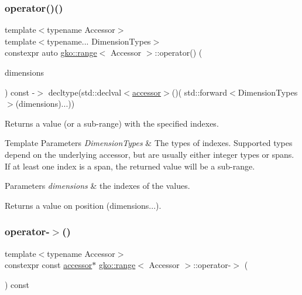 \subsubsection{\texorpdfstring{operator()()}{operator()()}}
{\footnotesize\ttfamily template$<$typename Accessor$>$ \\
template$<$typename... Dimension\+Types$>$ \\
constexpr auto \hyperlink{classgko_1_1range}{gko\+::range}$<$ Accessor $>$\+::operator() (\begin{DoxyParamCaption}\item[{Dimension\+Types \&\&...}]{dimensions }\end{DoxyParamCaption}) const -\/$>$ decltype(std\+::declval$<$\hyperlink{classgko_1_1range_a3332728e51dadcf6517847cef3000a17}{accessor}$>$()(
            std\+::forward$<$Dimension\+Types$>$(dimensions)...))
    }



Returns a value (or a sub-\/range) with the specified indexes. 


\begin{DoxyTemplParams}{Template Parameters}
{\em Dimension\+Types} & The types of indexes. Supported types depend on the underlying accessor, but are usually either integer types or spans. If at least one index is a span, the returned value will be a sub-\/range.\\
\hline
\end{DoxyTemplParams}

\begin{DoxyParams}{Parameters}
{\em dimensions} & the indexes of the values.\\
\hline
\end{DoxyParams}
\begin{DoxyReturn}{Returns}
a value on position {\ttfamily (dimensions...)}. 
\end{DoxyReturn}
\mbox{\label{classgko_1_1range_ad846fcf80cb6cd8881cd7dd8dddc6ca9}} 
\subsubsection{\texorpdfstring{operator-\/$>$()}{operator->()}}
{\footnotesize\ttfamily template$<$typename Accessor$>$ \\
constexpr const \hyperlink{classgko_1_1range_a3332728e51dadcf6517847cef3000a17}{accessor}$\ast$ \hyperlink{classgko_1_1range}{gko\+::range}$<$ Accessor $>$\+::operator-\/$>$ (\begin{DoxyParamCaption}{ }\end{DoxyParamCaption}) const\hspace{0.3cm}{\ttfamily [noexcept]}}



